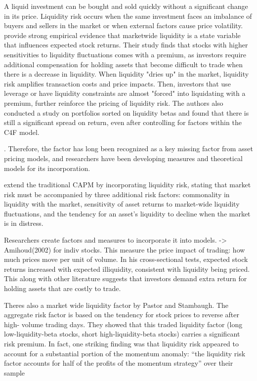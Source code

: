 A liquid investment can be bought and sold quickly without a significant change in its price. Liquidity risk occurs when the same investment faces an imbalance of buyers and sellers in the market or when external factors cause price volatility.  provide strong empirical evidence that marketwide liquidity is a state variable that influences expected stock returns. Their study finds that stocks with higher sensitivities to liquidity fluctuations comes with a premium, as investors require additional compensation for holding assets that become difficult to trade when there is a decrease in liquidity. When liquidity "dries up" in the market, liquidity risk amplifies transaction costs and price impacts. Then, investors that use leverage or have liquidity constraints are almost "forced" into liquidating with a premium, further reinforce the pricing of liquidity risk. The authors also conducted a study on portfolios sorted on liquidity betas and found that there is still a significant spread on return, even after controlling for factors within the C4F model.

. Therefore, the factor has long been recognized as a key missing factor from asset pricing models, and researchers have been developing measures and theoretical models for its incorporation. 



 extend the traditional CAPM by incorporating liquidity risk, stating that market risk must be accompanied by three additional risk factors:  commonality in liquidity with the market, sensitivity of asset returns to market-wide liquidity fluctuations, and the tendency for an asset's liquidity to decline when the market is in distress.



Researchers create factors and measures to incorporate it into models. -> Amihoud(2002) for indiv stocks. This measure the price impact of trading: how much prices move per unit of volume. In his cross-sectional tests, expected stock returns increased with expected illiquidity, consistent with liquidity being priced. This along with other literature suggests that investors demand extra return for holding assets that are costly to trade.

Theres also a market wide liquidity factor by Pastor and Stambaugh. The aggregate risk factor is based on the tendency for stock prices to reverse after high- volume trading days. They showed that this traded liquidity factor (long low-liquidity-beta stocks, short high-liquidity-beta stocks) carries a significant risk premium. In fact, one striking finding was that liquidity risk appeared to account for a substantial portion of the momentum anomaly: “the liquidity risk factor accounts for half of the profits of the momentum strategy” over their sample

